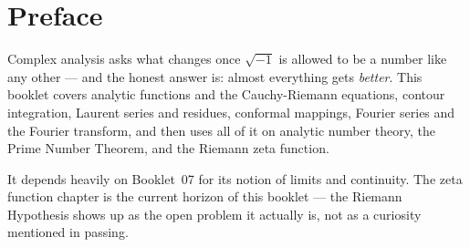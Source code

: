\chapter*{Preface}

Complex analysis asks what changes once $\sqrt{-1}$ is allowed
to be a number like any other --- and the honest answer is: almost
everything gets \textit{better}. This booklet covers analytic functions
and the Cauchy-Riemann equations, contour integration, Laurent series
and residues, conformal mappings, Fourier series and the Fourier
transform, and then uses all of it on analytic number theory, the Prime
Number Theorem, and the Riemann zeta function.

It depends heavily on Booklet~07 for its notion of limits and
continuity. The zeta function chapter is the current horizon of this
booklet --- the Riemann Hypothesis shows up as the open problem it
actually is, not as a curiosity mentioned in passing.

